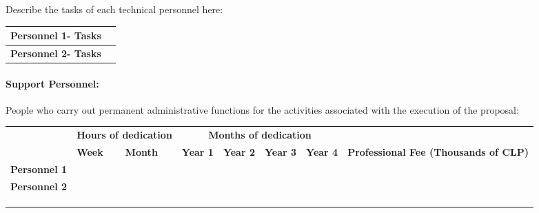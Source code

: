 \documentclass[MAIN.tex]{subfiles}
\begin{document}
\bigskip

\noindent Describe the tasks of each technical personnel here:

\smallskip

\noindent\begin{tabularx}{\linewidth}{|m{.3\linewidth}|X|}
\hline
\cellcolor{tcc}\textbf{Personnel 1- Tasks} & \\\hline
\cellcolor{tcc}\textbf{Personnel 2- Tasks} & \\\hline
\end{tabularx}

\paragraph*{Support Personnel:} People who carry out permanent administrative functions for the activities associated with the execution of the proposal:

\medskip

\noindent\begin{tabularx}{\linewidth}{|m{.26\linewidth}|X|X|X|X|X|X|m{.20\linewidth}|}
\hline
\cellcolor{tcc}
& \multicolumn{2}{c|}{\cellcolor{tcc}\begin{minipage}{.14\linewidth}\centering\textbf{Hours of dedication}\vspace{3pt}\end{minipage}}
& \multicolumn{4}{c|}{\cellcolor{tcc}\textbf{Months of dedication}}
& \cellcolor{tcc}
\tabularnewline
\hhline{|>{\arrayrulecolor{tcc}}->{\arrayrulecolor{black}}|------>{\arrayrulecolor{tcc}}->{\arrayrulecolor{black}}}
\multirow{-2}{*}{\cellcolor{tcc}\textbf{Support personnel}}
& \cellcolor{tcc}\centering\small\textbf{Week}
& \cellcolor{tcc}\centering\small\textbf{Month}
& \cellcolor{tcc}\centering\small\textbf{Year 1}
& \cellcolor{tcc}\centering\small\textbf{Year 2}
& \cellcolor{tcc}\centering\small\textbf{Year 3}
& \cellcolor{tcc}\centering\small\textbf{Year 4}
& \multirow{-2}{.20\textwidth}{\cellcolor{tcc}\centering\textbf{Professional Fee (Thousands of CLP)}}
\tabularnewline
\hline
\textbf{Personnel 1} & & & & & & & \\\hline
\textbf{Personnel 2} & & & & & & & \\\hline
 & & & & & & & \\\hline
 & & & & & & & \\\hline
 & & & & & & & \\\hline
\end{tabularx}

\bigskip
\end{document}
